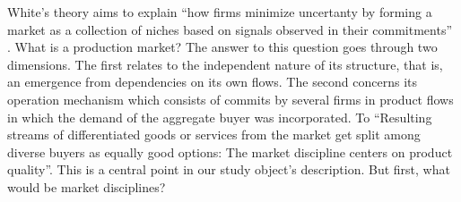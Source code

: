 \documentclass[a4paper, 12pt, openright, oneside, german, french, brazil, english]{abntex2}
\begin{document}
	
	White's theory aims to explain ``how firms minimize uncertanty by forming a market as a collection of niches based on signals observed in their commitments'' \cite[p. xiii]{white2002markets}. What is a production market? The answer to this question goes through two dimensions. The first relates to the independent nature of its structure, that is, an emergence from dependencies on its own flows. The second concerns its operation mechanism which consists of commits by several firms in product flows in which the demand of the aggregate buyer was incorporated. To  ``Resulting streams of differentiated goods or services from the market get split among diverse buyers as equally good options: The market discipline centers on product quality''. This is a central point in our study object's description. But first, what would be market disciplines?
	
	
\end{document}
